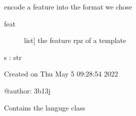 \documentclass[letterpaper,10pt,english]{sphinxmanual}
\begin{document}

\begin{fulllineitems}
\label{\detokenize{index:encoder_decoder.encode_f}}
\sphinxAtStartPar
encode a feature into the format we chose
\begin{description}
\item[{feat}] \leavevmode{[}list{]}
\sphinxAtStartPar
the feature rpz of a template

\end{description}

\sphinxAtStartPar
s : str

\end{fulllineitems}

\label{\detokenize{index:module-IPA_utils}}\label{\detokenize{index:module-Language}}
\sphinxAtStartPar
Created on Thu May  5 09:28:54 2022

\sphinxAtStartPar
@author: 3b13j

\sphinxAtStartPar
Contains the languge class
\end{document}
